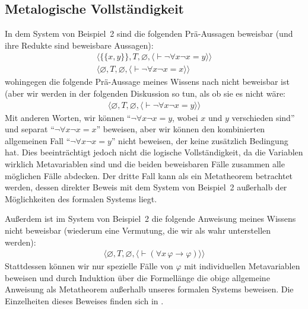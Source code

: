 \subsection{Metalogische Vollständigkeit}

In dem System von Beispiel~2 sind die folgenden Prä-Aussagen beweisbar (und ihre Redukte sind beweisbare Aussagen): 
\begin{eqnarray*}
      & \langle\{\{x,y\}\},T,\varnothing,
               \langle \vdash\lnot\forall x\lnot x=y
               \rangle\rangle & \\
     &  \langle\varnothing,T,\varnothing,
               \langle \vdash\lnot\forall x\lnot x=x
               \rangle\rangle &
\end{eqnarray*}
wohingegen die folgende Prä-Aussage meines Wissens nach nicht beweisbar ist (aber wir werden in der folgenden Diskussion so tun, als ob sie es nicht wäre: 
\begin{eqnarray*}
     &  \langle\varnothing,T,\varnothing,
               \langle \vdash\lnot\forall x\lnot x=y
               \rangle\rangle &
\end{eqnarray*}
Mit anderen Worten, wir können "`$\lnot\forall x\lnot x=y$, wobei $x$ und $y$ verschieden sind"' und separat "`$\lnot\forall x\lnot x=x$"' beweisen, aber wir können den kombinierten allgemeinen Fall "`$\lnot\forall x\lnot x=y$"' nicht beweisen, der keine zusätzlich Bedingung hat.  Dies beeinträchtigt jedoch nicht die logische Vollständigkeit, da die Variablen wirklich Metavariablen sind und die beiden beweisbaren Fälle zusammen alle möglichen Fälle abdecken.  Der dritte Fall kann als ein Metatheorem betrachtet werden, dessen direkter Beweis mit dem System von Beispiel~2 außerhalb der Möglichkeiten des formalen Systems liegt. 

Außerdem ist im System von Beispiel~2 die folgende Anweisung meines Wissens nicht beweisbar (wiederum eine Vermutung, die wir als wahr unterstellen werden): 
\begin{eqnarray*}
     & \langle\varnothing,T,\varnothing,
               \langle \vdash(\forall x\, \varphi\to\varphi)
               \rangle\rangle &
\end{eqnarray*}
Stattdessen können wir nur spezielle Fälle von $\varphi$ mit individuellen Metavariablen beweisen und durch Induktion über die Formellänge die obige allgemeine Anweisung als Metatheorem außerhalb unseres formalen Systems beweisen.  Die Einzelheiten dieses Beweises finden sich in \cite{Kalish}. 

